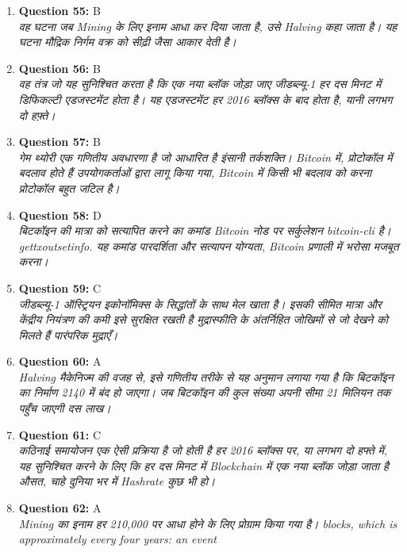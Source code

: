 \documentclass[12pt,a4paper]{article}
\begin{document}
\begin{enumerate}
\item \textbf{Question 55:} B
\\ \textit{वह घटना जब Mining के लिए इनाम आधा कर दिया जाता है, उसे Halving कहा जाता है। यह घटना मौद्रिक निर्गम वक्र को सीढ़ी जैसा आकार देती है।}

\item \textbf{Question 56:} B
\\ \textit{वह तंत्र जो यह सुनिश्चित करता है कि एक नया ब्लॉक जोड़ा जाए जीडब्ल्यू-1 हर दस मिनट में डिफिकल्टी एडजस्टमेंट होता है। यह एडजस्टमेंट हर 2016 ब्लॉक्स के बाद होता है, यानी लगभग दो हफ़्ते।}

\item \textbf{Question 57:} B
\\ \textit{गेम थ्योरी एक गणितीय अवधारणा है जो आधारित है इंसानी तर्कशक्ति। Bitcoin में, प्रोटोकॉल में बदलाव होते हैं उपयोगकर्ताओं द्वारा लागू किया गया, Bitcoin में किसी भी बदलाव को करना प्रोटोकॉल बहुत जटिल है।}

\item \textbf{Question 58:} D
\\ \textit{बिटकॉइन की मात्रा को सत्यापित करने का कमांड Bitcoin नोड पर सर्कुलेशन bitcoin-cli है। gettxoutsetinfo. यह कमांड पारदर्शिता और सत्यापन योग्यता, Bitcoin प्रणाली में भरोसा मजबूत करना।}

\item \textbf{Question 59:} C
\\ \textit{जीडब्ल्यू-1 ऑस्ट्रियन इकोनॉमिक्स के सिद्धांतों के साथ मेल खाता है। इसकी सीमित मात्रा और केंद्रीय नियंत्रण की कमी इसे सुरक्षित रखती है मुद्रास्फीति के अंतर्निहित जोखिमों से जो देखने को मिलते हैं पारंपरिक मुद्राएँ।}

\item \textbf{Question 60:} A
\\ \textit{Halving मैकेनिज्म की वजह से, इसे गणितीय तरीके से यह अनुमान लगाया गया है कि बिटकॉइन का निर्माण 2140 में बंद हो जाएगा। जब बिटकॉइन की कुल संख्या अपनी सीमा 21 मिलियन तक पहुँच जाएगी दस लाख।}

\item \textbf{Question 61:} C
\\ \textit{कठिनाई समायोजन एक ऐसी प्रक्रिया है जो होती है हर 2016 ब्लॉक्स पर, या लगभग दो हफ्ते में, यह सुनिश्चित करने के लिए कि हर दस मिनट में Blockchain में एक नया ब्लॉक जोड़ा जाता है औसत, चाहे दुनिया भर में Hashrate कुछ भी हो।}

\item \textbf{Question 62:} A
\\ \textit{Mining का इनाम हर 210,000 पर आधा होने के लिए प्रोग्राम किया गया है। blocks, which is approximately every four years: an event}


\end{enumerate}
\end{document}
